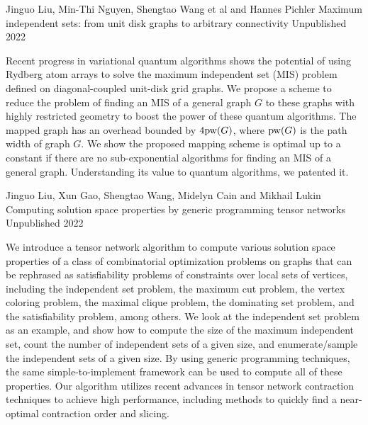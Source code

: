 \documentclass[11pt, a4paper]{awesome-cv}
\begin{document}
%
%
\begin{cventries}
  \cventry
    {Jinguo Liu, Min-Thi Nguyen, Shengtao Wang et al and Hannes Pichler} %
    {Maximum independent sets: from unit disk graphs to arbitrary connectivity} %
    {Unpublished} %
    {2022} %
    {
      \begin{cvitems} %
        {
        Recent progress in variational quantum algorithms shows the potential of using Rydberg atom arrays to solve the maximum independent set (MIS) problem defined on diagonal-coupled unit-disk grid graphs.
    We propose a scheme to reduce the problem of finding an MIS of a general graph $G$ to these graphs with highly restricted geometry to boost the power of these quantum algorithms.
          The mapped graph has an overhead bounded by $4 {\rm pw}(G)$, where ${\rm pw}(G)$ is the path width of graph $G$.
    We show the proposed mapping scheme is optimal up to a constant if there are no sub-exponential algorithms for finding an MIS of a general graph.
    Understanding its value to quantum algorithms, we patented it.
}
      \end{cvitems}
    }
  \cventry
    {Jinguo Liu, Xun Gao, Shengtao Wang, Midelyn Cain and Mikhail Lukin} %
    {Computing solution space properties by generic programming tensor networks} %
    {Unpublished} %
    {2022} %
    {
      \begin{cvitems} %
      {We introduce a tensor network algorithm %
to compute various solution space properties of a class of combinatorial optimization problems on graphs that can be rephrased as satisfiability problems of constraints over local sets of vertices, including the independent set problem, the maximum cut problem, the vertex coloring problem, the maximal clique problem, the dominating set problem, and the satisfiability problem, among others.
We look at the independent set problem as an example, and show how to compute the size of the maximum independent set, count the number of independent sets of a given size, and enumerate/sample the independent sets of a given size.
By using generic programming techniques, %
the same simple-to-implement framework can be used to compute all of these properties. Our algorithm utilizes recent advances in tensor network contraction techniques to achieve high performance, including methods to quickly find a near-optimal contraction order and slicing.
}
\end{cvitems}}
\end{cventries}
\end{document}
